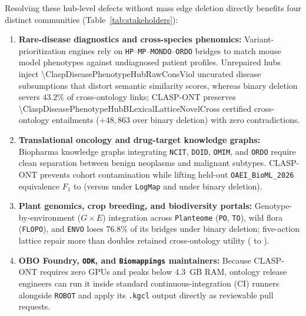 \documentclass[10pt]{article}
\theoremstyle{accentdef}
\begin{document}
Resolving these hub-level defects without mass edge deletion directly benefits four distinct communities (Table~\ref{tab:stakeholders}):
\begin{enumerate}
  \item \textbf{Rare-disease diagnostics and cross-species phenomics:} Variant-prioritization engines rely on \texttt{HP}--\texttt{MP}--\texttt{MONDO}--\texttt{ORDO} bridges to match mouse model phenotypes against undiagnosed patient profiles. Unrepaired hubs inject \num{\ClaspDiseasePhenotypeHubRawConsViol} uncurated disease subsumptions that distort semantic similarity scores, whereas binary deletion severs $43.2\%$ of cross-ontology links; \textsc{CLASP-ONT} preserves \num{\ClaspDiseasePhenotypeHubBLexicalLatticeNovelCross} certified cross-ontology entailments ($+48{,}863$ over binary deletion) with zero contradictions.
  \item \textbf{Translational oncology and drug-target knowledge graphs:} Biopharma knowledge graphs integrating \texttt{NCIT}, \texttt{DOID}, \texttt{OMIM}, and \texttt{ORDO} require clean separation between benign neoplasms and malignant subtypes. \textsc{CLASP-ONT} prevents cohort contamination while lifting held-out \texttt{OAEI\_BioML\_2026} equivalence $F_1$ to \ClaspOAEIBioMLBLexicalLatticeEquivFone{} (versus \ClaspOAEIBioMLBLogMapRepairEquivFone{} under \texttt{LogMap} and \ClaspOAEIBioMLBASPBinaryDeleteEquivFone{} under binary deletion).
  \item \textbf{Plant genomics, crop breeding, and biodiversity portals:} Genotype-by-environment ($G \times E$) integration across \texttt{Planteome} (\texttt{PO}, \texttt{TO}), wild flora (\texttt{FLOPO}), and \texttt{ENVO} loses $76.8\%$ of its bridges under binary deletion; five-action lattice repair more than doubles retained cross-ontology utility (\ClaspPlantBiodivHubBASPBinaryDeleteRetention{} to \ClaspPlantBiodivHubBLexicalLatticeRetention{}).
  \item \textbf{OBO Foundry, \texttt{ODK}, and \texttt{Biomappings} maintainers:} Because \textsc{CLASP-ONT} requires zero GPUs and peaks below $4.3$~GB RAM, ontology release engineers can run it inside standard continuous-integration (CI) runners alongside \texttt{ROBOT} and apply its \texttt{.kgcl} output directly as reviewable pull requests.
\end{enumerate}
\end{document}
